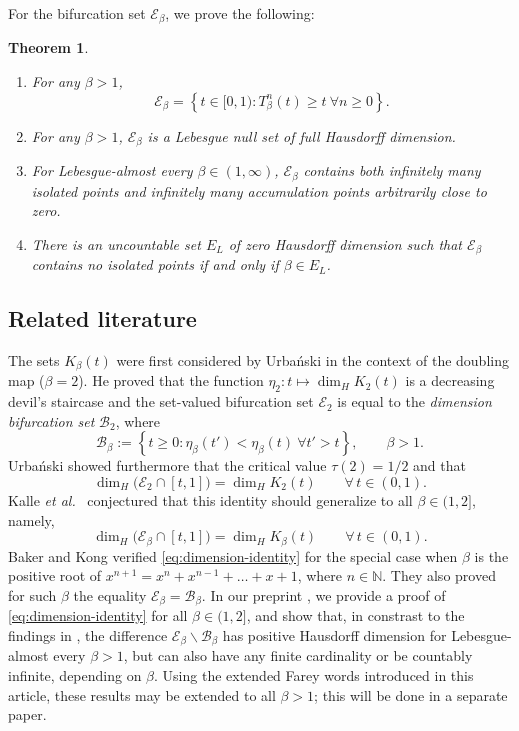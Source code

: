 \documentclass[12pt]{amsart}
\newtheorem{theorem}{Theorem}[section]
\theoremstyle{definition}
\theoremstyle{remark}
\numberwithin{equation}{section}
\newcommand{\N}{\ensuremath{\mathbb{N}}}
\newcommand{\E}{\mathscr{E}}
\newcommand{\BB}{\mathscr{B}}
\newcommand{\set}[1]{\left\{#1\right\}}
\newcommand{\f}{\infty}
\begin{document}
For the bifurcation set $\E_\beta$, we prove the following:

\begin{theorem} \label{thm:isolated-bifurcation-set}\mbox{} 
  \begin{enumerate}[{\rm(i)}]
	\item For any $\beta>1$,
	\[
	\E_\beta=\set{t\in[0,1): T_\beta^n(t)\ge t~\forall n\ge 0}.
	\]
	\item For any $\beta>1$, $\E_\beta$ is a Lebesgue null set of full Hausdorff dimension.
  \item For Lebesgue-almost every $\beta\in(1,\f)$, $\E_\beta$ contains both infinitely many isolated points and infinitely many accumulation points arbitrarily close to zero.
  \item There is an uncountable set $E_L$ of zero Hausdorff dimension such that ${\E_\beta}$ contains no isolated points if and only if $\beta\in E_L$.
  \end{enumerate}
\end{theorem}



\subsection{Related literature}

The sets $K_\beta(t)$ were first considered by Urba\'nski \cite{Urbanski-87} in the context of the doubling map ($\beta=2$). He proved that the function $\eta_2: t\mapsto \dim_H K_2(t)$ is a decreasing devil's staircase and the set-valued bifurcation set $\E_2$ is equal to the {\em dimension bifurcation set} $\BB_2$, where
\[
\BB_\beta:=\set{t\ge 0: \eta_\beta(t')<\eta_\beta(t)~\forall t'>t}, \qquad \beta>1.
\]
Urba\'{n}ski showed furthermore that the critical value $\tau(2)=1/2$ and that
\begin{equation*}
\dim_H\big(\E_2\cap[t,1]\big)=\dim_H K_2(t) \qquad \forall\,t\in(0,1).
\end{equation*}
Kalle {\em et al.}~\cite{Kalle-Kong-Langeveld-Li-18} conjectured that this identity should generalize to all $\beta\in(1,2]$, namely,
\begin{equation} \label{eq:dimension-identity}
\dim_H\big(\E_\beta\cap[t,1]\big)=\dim_H K_\beta(t) \qquad \forall\,t\in(0,1).
\end{equation}
Baker and Kong \cite{Baker-Kong-2020} verified \eqref{eq:dimension-identity} for the special case when $\beta$ is the positive root of $x^{n+1}=x^n+x^{n-1}+\dots+x+1$, where $n\in\N$. They also proved for such $\beta$ the equality $\E_\beta=\BB_\beta$. In our preprint \cite{Allaart-Kong-2023}, we provide a proof of \eqref{eq:dimension-identity} for all $\beta\in(1,2]$, and show that, in constrast to the findings in \cite{Baker-Kong-2020,Urbanski-87}, the difference $\E_\beta\backslash\BB_\beta$ has positive Hausdorff dimension for Lebesgue-almost every $\beta>1$, but can also have any finite cardinality or be countably infinite, depending on $\beta$. Using the extended Farey words introduced in this article, these results may be extended to all $\beta>1$; this will be done in a separate paper.
\end{document}

